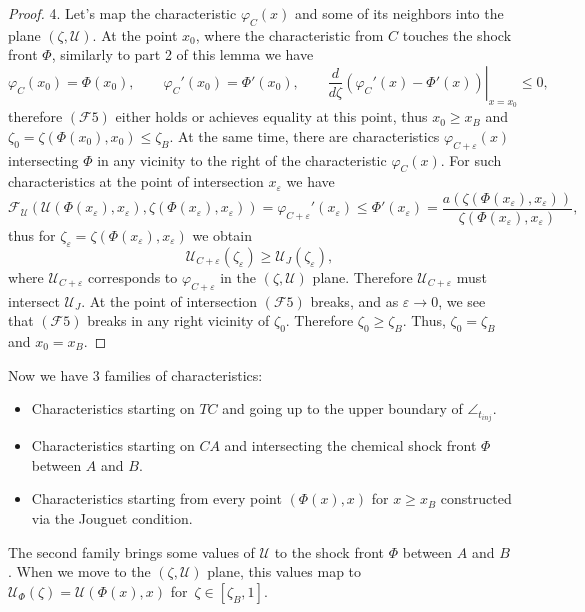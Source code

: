 \documentclass[12pt]{article}
\theoremstyle{definition}
\begin{document}
\begin{proof}
4. Let's map the characteristic $\varphi_C(x)$ and some of its neighbors into the plane $(\zeta, \mathcal U)$. 
At the point $x_0$, where the characteristic from $C$ touches the shock front $\Phi$, similarly to part 2 of this lemma we have
\[
\varphi_C(x_0) = \Phi(x_0), \qquad \varphi_C'(x_0) = \Phi'(x_0), \qquad \left.\dfrac{d}{d\zeta}(\varphi_C'(x) - \Phi'(x))\right|_{x=x_0} \leqslant 0,
\]
therefore $(\mathcal F 5)$ either holds or achieves equality at this point, thus $x_0 \geqslant x_B$ and $\zeta_0 = \zeta(\Phi(x_0), x_0) \leqslant \zeta_B$. At the same time, there are characteristics $\varphi_{C+\varepsilon}(x)$ intersecting $\Phi$ in any vicinity to the right of the characteristic $\varphi_C(x)$. For such characteristics at the point of intersection $x_\varepsilon$ we have
\[
\mathcal F_{\mathcal U}(\mathcal U(\Phi(x_\varepsilon), x_\varepsilon), \zeta(\Phi(x_\varepsilon), x_\varepsilon)) = \varphi_{C+\varepsilon}'(x_\varepsilon) \leqslant \Phi'(x_\varepsilon) = \dfrac{a(\zeta(\Phi(x_\varepsilon), x_\varepsilon))}{\zeta(\Phi(x_\varepsilon), x_\varepsilon)},
\]
thus for $\zeta_\varepsilon = \zeta(\Phi(x_\varepsilon), x_\varepsilon)$ we obtain 
\[
\mathcal U_{C+\varepsilon}(\zeta_\varepsilon) \geqslant \mathcal U_J(\zeta_\varepsilon),
\]
where $\mathcal U_{C+\varepsilon}$ corresponds to $\varphi_{C+\varepsilon}$ in the $(\zeta, \mathcal U)$ plane. Therefore $\mathcal U_{C+\varepsilon}$ must intersect $\mathcal U_J$. At the point of intersection $(\mathcal F 5)$ breaks, and as $\varepsilon\to 0$, we see that $(\mathcal F 5)$ breaks in any right vicinity of $\zeta_0$. Therefore $\zeta_0 \geqslant \zeta_B$. Thus, $\zeta_0 = \zeta_B$ and $x_0 = x_B$.
\end{proof}

Now we have 3 families of characteristics: 
\begin{itemize}
    \item Characteristics starting on $TC$ and going up to the upper boundary of $\angle_{t_{inj}}$. 
    \item Characteristics starting on $CA$ and intersecting the chemical shock front $\Phi$ between $A$ and $B$.
    \item Characteristics starting from every point $(\Phi(x), x)$ for $x \geqslant x_B$ constructed via the Jouguet condition. 
\end{itemize}

The second family brings some values of $\mathcal U$ to the shock front $\Phi$ between $A$ and $B$. When we move to the $(\zeta, \mathcal U)$ plane, this values map to $\mathcal U_\Phi(\zeta) = \mathcal U(\Phi(x), x)$ for~$\zeta \in [\zeta_B, 1]$.
\end{document}
